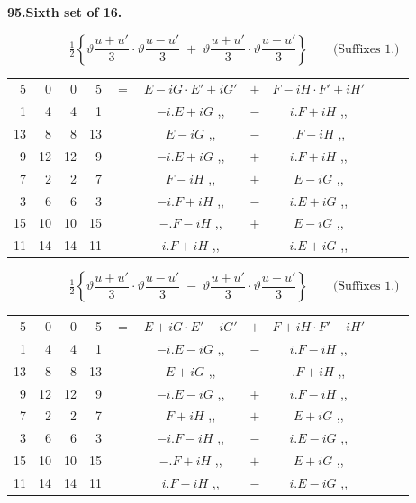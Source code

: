 \documentclass[11pt]{article}
\newcommand{\half}{\tfrac{1}{2}}
\begin{document}
\medskip
\begin{center}\textbf{95.\quad Sixth set of 16.}\end{center}

\[
\half\!\left\{\vartheta\frac{u+u'}{3}\cdot\vartheta\frac{u-u'}{3}\;+\;\vartheta\frac{u+u'}{3}\cdot\vartheta\frac{u-u'}{3}\right\}\qquad\text{(Suffixes 1.)}
\]
{\small
\begin{center}
\begin{tabular}{rrrrr@{\ }c@{\ }lcr@{\ }c@{\ }l}
5  & 0  & 0  & 5  & $=$ & $E-iG\cdot E'+iG'$ & $+$ & $F-iH\cdot F'+iH'$ \\
1  & 4  & 4  & 1  & & $-i.E+iG$ \quad ,, & $-$ & $i.F+iH$ \quad ,, \\
13 & 8  & 8  & 13 & & $E-iG$ \quad ,, & $-$ & $.F-iH$ \quad ,, \\
9  & 12 & 12 & 9  & & $-i.E+iG$ \quad ,, & $+$ & $i.F+iH$ \quad ,, \\
7  & 2  & 2  & 7  & & $F-iH$ \quad ,, & $+$ & $E-iG$ \quad ,, \\
3  & 6  & 6  & 3  & & $-i.F+iH$ \quad ,, & $-$ & $i.E+iG$ \quad ,, \\
15 & 10 & 10 & 15 & & $-.F-iH$ \quad ,, & $+$ & $E-iG$ \quad ,, \\
11 & 14 & 14 & 11 & & $i.F+iH$ \quad ,, & $-$ & $i.E+iG$ \quad ,, \\
\end{tabular}
\end{center}
}

\[
\half\!\left\{\vartheta\frac{u+u'}{3}\cdot\vartheta\frac{u-u'}{3}\;-\;\vartheta\frac{u+u'}{3}\cdot\vartheta\frac{u-u'}{3}\right\}\qquad\text{(Suffixes 1.)}
\]
{\small
\begin{center}
\begin{tabular}{rrrrr@{\ }c@{\ }lcr@{\ }c@{\ }l}
5  & 0  & 0  & 5  & $=$ & $E+iG\cdot E'-iG'$ & $+$ & $F+iH\cdot F'-iH'$ \\
1  & 4  & 4  & 1  & & $-i.E-iG$ \quad ,, & $-$ & $i.F-iH$ \quad ,, \\
13 & 8  & 8  & 13 & & $E+iG$ \quad ,, & $-$ & $.F+iH$ \quad ,, \\
9  & 12 & 12 & 9  & & $-i.E-iG$ \quad ,, & $+$ & $i.F-iH$ \quad ,, \\
7  & 2  & 2  & 7  & & $F+iH$ \quad ,, & $+$ & $E+iG$ \quad ,, \\
3  & 6  & 6  & 3  & & $-i.F-iH$ \quad ,, & $-$ & $i.E-iG$ \quad ,, \\
15 & 10 & 10 & 15 & & $-.F+iH$ \quad ,, & $+$ & $E+iG$ \quad ,, \\
11 & 14 & 14 & 11 & & $i.F-iH$ \quad ,, & $-$ & $i.E-iG$ \quad ,, \\
\end{tabular}
\end{center}
}
\end{document}
